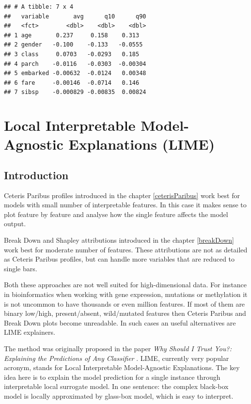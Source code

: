 \documentclass[12pt,]{krantz}
\theoremstyle{definition}
\theoremstyle{definition}
\theoremstyle{definition}
\theoremstyle{remark}
\begin{document}
\begin{verbatim}
## # A tibble: 7 x 4
##   variable       avg      q10      q90
##   <fct>        <dbl>    <dbl>    <dbl>
## 1 age       0.237     0.158    0.313  
## 2 gender   -0.100    -0.133   -0.0555 
## 3 class     0.0703   -0.0293   0.185  
## 4 parch    -0.0116   -0.0303  -0.00304
## 5 embarked -0.00632  -0.0124   0.00348
## 6 fare     -0.00146  -0.0714   0.146  
## 7 sibsp    -0.000829 -0.00835  0.00824
\end{verbatim}

\hypertarget{LIME}{%
\section{Local Interpretable Model-Agnostic Explanations
(LIME)}\label{LIME}}

\hypertarget{introduction-1}{%
\subsection{Introduction}\label{introduction-1}}

Ceteris Paribus profiles introduced in the chapter \ref{ceterisParibus}
work best for models with small number of interpretable features. In
this case it makes sense to plot feature by feature and analyse how the
single feature affects the model output.

Break Down and Shapley attributions introduced in the chapter
\ref{breakDown} work best for moderate number of features. These
attributions are not as detailed as Ceteris Paribus profiles, but can
handle more variables that are reduced to single bars.

Both these approaches are not well suited for high-dimensional data. For
instance in bioinformatics when working with gene expression, mutations
or methylation it is not uncommon to have thousands or even million
features. If most of them are binary low/high, present/absent,
wild/mutated features then Ceteris Paribus and Break Down plots become
unreadable. In such cases an useful alternatives are LIME explainers.

The method was originally proposed in the paper \emph{Why Should I Trust
You?: Explaining the Predictions of Any Classifier} \citep{lime}. LIME,
currently very popular acronym, stands for Local Interpretable
Model-Agnostic Explanations. The key idea here is to explain the model
prediction for a single instance through interpretable local surrogate
model. In one sentence: the complex black-box model is locally
approximated by glass-box model, which is easy to interpret.
\end{document}
